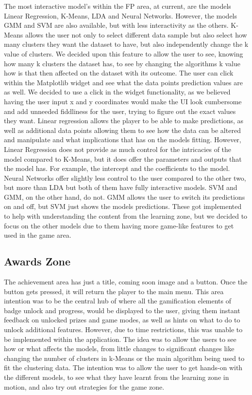	The most interactive model's within the FP area, at current, are the models Linear Regression, K-Means, LDA and Neural Networks. However, the models GMM and SVM are also available, but with less interactivity as the others. K-Means allows the user not only to select different data sample but also select how many clusters they want the dataset to have, but also independently change the k value of clusters. We decided upon this feature to allow the user to see, knowing how many k clusters the dataset has, to see by changing the algorithms k value how is that then affected on the dataset with its outcome. The user can click within the Matplotlib widget and see what the data points prediction values are as well. We decided to use a click in the widget functionality, as we believed having the user input x and y coordinates would make the UI look cumbersome and add unneeded fiddliness for the user, trying to figure out the exact values they want. Linear regression allows the player to be able to make predictions, as well as additional data points allowing them to see how the data can be altered and manipulate and what implications that has on the models fitting. However, Linear Regression does not provide as much control for the intricacies of the model compared to K-Means, but it does offer the parameters and outputs that the model has. For example, the intercept and the coefficients to the model. Neural Networks offer slightly less control to the user compared to the other two, but more than LDA but both of them have fully interactive models. SVM and GMM, on the other hand, do not. GMM allows the user to switch its predictions on and off, but SVM just shows the models predictions. These got implemented to help with understanding the content from the learning zone, but we decided to focus on the other models due to them having more game-like features to get used in the game area.
	
	
	
	
	\subsection{Awards Zone}
	
	
	The achievement area has just a title, coming soon image and a button. Once the button gets pressed, it will return the player to the main menu. This area intention was to be the central hub of where all the gamification elements of badge unlock and progress, would be displayed to the user, giving them instant feedback on unlocked prizes and game modes,  as well as hints on what to do to unlock additional features. However, due to time restrictions, this was unable to be implemented within the application. The idea was to allow the users to see how or what affects the models, from little changes to significant changes like changing the number of clusters in k-Means or the main algorithm being used to fit the clustering data. The intention was to allow the user to get hands-on with the different models, to see what they have learnt from the learning zone in motion, and also try out strategies for the game zone. 
	
